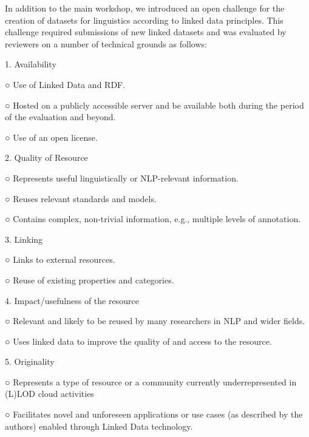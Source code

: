\documentclass{article}
\begin{document}
\baselineskip=13pt
In addition to the main workshop, we introduced an open challenge for the creation 
of datasets for linguistics according to linked data principles. This challenge 
required submissions of new linked datasets and was evaluated by reviewers on a 
number of technical grounds as follows: 

\vspace{13pt}
\leftskip=36pt
\parindent=-18pt
{\large{}1. }Availability

\leftskip=72pt
{\large{}○ }Use of Linked Data and RDF.

{\large{}○ }Hosted on a publicly accessible server and be available both during 
the period of the evaluation and beyond.

{\large{}○ }Use of an open license.

\leftskip=36pt
{\large{}2. }Quality of Resource

\leftskip=72pt
{\large{}○ }Represents useful linguistically or NLP-relevant information.

{\large{}○ }Reuses relevant standards and models.

{\large{}○ }Contains complex, non-trivial information, e.g., multiple levels 
of annotation.

\leftskip=36pt
{\large{}3. }Linking

\leftskip=72pt
{\large{}○ }Links to external resources.

{\large{}○ }Reuse of existing properties and categories.

\leftskip=36pt
{\large{}4. }Impact/usefulness of the resource

\leftskip=72pt
{\large{}○ }Relevant and likely to be reused by many researchers in NLP and wider 
fields.

{\large{}○ }Uses linked data to improve the quality of and access to the resource.

\leftskip=36pt
{\large{}5. }Originality

\leftskip=72pt
{\large{}○ }Represents a type of resource or a community currently underrepresented 
in (L)LOD cloud activities

{\large{}○ }Facilitates novel and unforeseen applications or use cases (as described 
by the authors) enabled through Linked Data technology.
\end{document}
